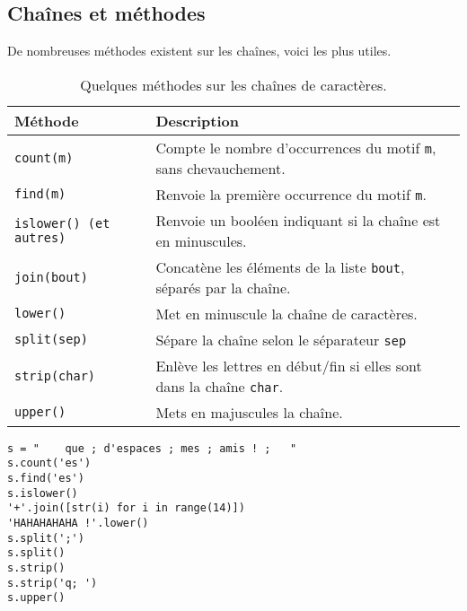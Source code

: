 \subsection{Chaînes et méthodes}
De nombreuses méthodes existent sur les chaînes, voici les plus utiles.
\begin{table}[!h]
  \begin{center}
    \begin{tabular}{lp{8cm}}
      \hline
      \textbf{Méthode} & \textbf{Description} \\ \hline
      \texttt{count(m)}& Compte le nombre d'occurrences du motif \texttt{m}, sans chevauchement.\\
      \texttt{find(m)}& Renvoie la première occurrence du motif \texttt{m}.\\
      \texttt{islower() (et autres)}& Renvoie un booléen indiquant si la chaîne est en minuscules. \\
      \texttt{join(bout)}& Concatène les éléments de la liste \texttt{bout}, séparés par la chaîne.\\
      \texttt{lower()}& Met en minuscule la chaîne de caractères.\\
      \texttt{split(sep)}& Sépare la chaîne selon le séparateur \texttt{sep}\\
      \texttt{strip(char)}& Enlève les lettres en début/fin si elles sont dans la chaîne \texttt{char}.\\
      \texttt{upper()}& Mets en majuscules la chaîne.  \\
      \hline
    \end{tabular}
   \caption{Quelques méthodes sur les chaînes de caractères.}
  \end{center}
\end{table}

\begin{lstlisting}
s = "    que ; d'espaces ; mes ; amis ! ;   "
s.count('es')
s.find('es')
s.islower()
'+'.join([str(i) for i in range(14)])
'HAHAHAHAHA !'.lower()
s.split(';')
s.split()
s.strip()
s.strip('q; ')
s.upper()
\end{lstlisting}
